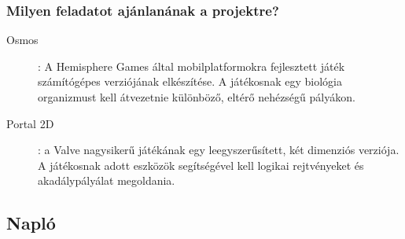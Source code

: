 		\subsubsection*{Milyen feladatot ajánlanának a projektre?}
		\begin{description}
\item[Osmos]: A Hemisphere Games által mobilplatformokra fejlesztett játék számítógépes verziójának elkészítése. A játékosnak egy biológia organizmust kell átvezetnie különböző, eltérő nehézségű pályákon.

\item[Portal 2D]: a Valve nagysikerű játékának egy leegyszerűsített, két dimenziós verziója. A játékosnak adott eszközök segítségével kell logikai rejtvényeket és akadálypályálat megoldania.		
        \end{description}
	\subsection{Napló}

